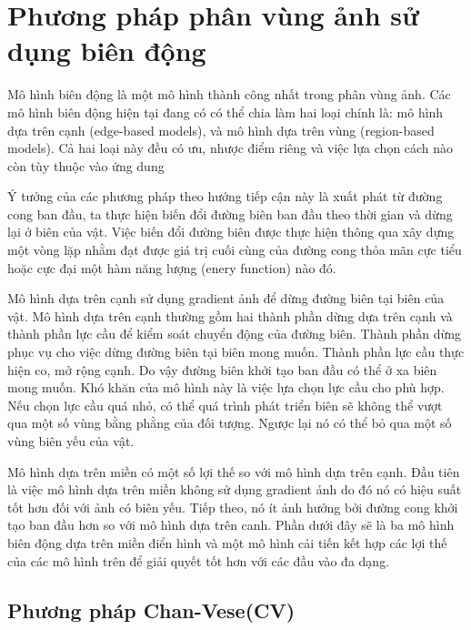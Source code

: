 \documentclass[12pt,oneside,a4]{report}
\begin{document}
\chapter{Phương pháp phân vùng ảnh sử dụng biên động}
Mô hình biên động là một mô hình thành công nhất trong phân vùng ảnh. Các mô hình biên động hiện tại đang có có thể chia làm hai loại chính là: mô hình dựa trên cạnh (edge-based models), và mô hình dựa trên vùng (region-based models). Cả hai loại này đều có ưu, nhược điểm riêng và việc lựa chọn cách nào còn tùy thuộc vào ứng dung

Ý tưởng của các phương pháp theo hướng tiếp cận này là xuất phát từ đường cong ban đầu, ta thực hiện biến đổi đường biên ban đầu theo thời gian  và dừng lại ở biên của vật. Việc biến đổi đường biên được thực hiện thông qua xây dựng một vòng lặp nhằm đạt được giá trị cuối cùng của đường cong thỏa mãn cực tiểu hoặc cực đại một hàm năng lượng (enery function) nào đó.

Mô hình dựa trên cạnh sử dụng gradient ảnh để dừng đường biên tại biên của vật. Mô hình dựa trên cạnh thường gồm hai thành phần dừng dựa trên cạnh  và thành phần lực cầu để kiểm soát chuyển động của đường biên. Thành phần dừng phục vụ cho việc dừng đường biên tại biên mong muốn. Thành phần lực cầu thực hiện co, mở rộng cạnh. Do vậy đường biên khởi tạo ban đầu có thể ở xa biên mong muốn. Khó khăn của mô hình này là việc lựa chọn lực cầu cho phù hợp. Nếu chọn lực cầu quá nhỏ, có thể quá trình phát triển biên sẽ không thể vượt qua một số vùng bằng phằng của đối tượng. Ngược lại nó có thể bỏ qua một số vùng biên yếu của vật.

Mô hình dựa trên miền có một số lợi thế so với mô hình dựa trên cạnh. Đầu tiên là việc mô hình dựa trên miền không sử dụng gradient ảnh do đó nó có hiệu suất tốt hơn đối với ảnh có biên yếu. Tiếp theo, nó ít ảnh hưởng bởi đường cong khởi tạo ban đầu hơn so với mô hình dựa trên canh.  Phần dưới đây sẽ là ba mô hình biên động dựa trên miền điển hình và một mô hình cải tiến kết hợp các lợi thế của các mô hình trên để giải quyết tốt hơn với các đầu vào đa dạng.
\section{Phương pháp Chan-Vese(CV)}
\end{document}
